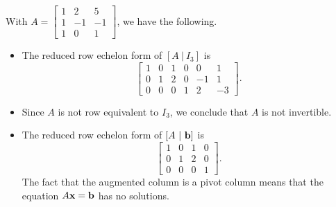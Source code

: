 \begin{example}
\item With $A = \left[ \begin{array}{crr} 1&2&5 \\ 1&-1&-1 \\ 1&0&1 \end{array} \right]$, we have the following.
\begin{itemize}
\item The reduced row echelon form of $[A \ | \ I_3]$ is 
\[ \left[ \begin{array}{ccc|crr} 1&0&1&0&0&1 \\ 0&1&2&0&-1&1  \\ 0&0&0&1&2&-3 \end{array} \right].\]
\item Since $A$ is not row equivalent to $I_3$, we conclude that $A$ is not invertible. 
\item The reduced row echelon form of $[A \ | \ \mathbf{b}]$ is 
\[ \left[ \begin{array}{ccc|c} 1&0&1&0 \\ 0&1&2&0 \\ 0&0&0&1 \end{array} \right].\]
The fact that the augmented column is a pivot column means that the equation $A \mathbf{x} = \mathbf{b}$ has no solutions. 
\end{itemize}

\ea


\end{example}

